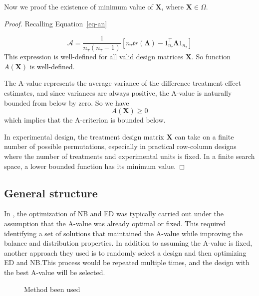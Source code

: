 \documentclass[
  a4paper,
  oneside,
  openany,
  12pt,
  onecolumn]{book}
\theoremstyle{definition}
\theoremstyle{definition}
\theoremstyle{plain}
\theoremstyle{remark}
\begin{document}
Now we proof the existence of minimum value of \(\boldsymbol{X}\), where
\(\boldsymbol{X}\in\Omega\).

\begin{proof}
Recalling Equation~\ref{eq-an}

\[
\mathcal{A}=\frac{1}{n_{\tau}(n_{\tau}-1)}[n_{\tau}tr(\boldsymbol{\Lambda})-\mathcal{1}_{n_{\tau}}^\top\boldsymbol{\Lambda}\mathcal{1}_{n_{\tau}}]
\] This expression is well-defined for all valid design matrices
\(\boldsymbol{X}\). So function \(A(\boldsymbol{X})\) is well-defined.

The A-value represents the average variance of the difference treatment
effect estimates, and since variances are always positive, the A-value
is naturally bounded from below by zero. So we have \[
A(\boldsymbol{X})\geq0
\] which implies that the A-criterion is bounded below.

In experimental design, the treatment design matrix \(\boldsymbol{X}\)
can take on a finite number of possible permutations, especially in
practical row-column designs where the number of treatments and
experimental units is fixed. In a finite search space, a lower bounded
function has its minimum value.
\end{proof}

\subsection{General structure}\label{general-structure}

In \citet{piepho2018neighbor}, the optimization of NB and ED was
typically carried out under the assumption that the A-value was already
optimal or fixed. This required identifying a set of solutions that
maintained the A-value while improving the balance and distribution
properties. In addition to assuming the A-value is fixed, another
approach they used is to randomly select a design and then optimizing ED
and NB.This process would be repeated multiple times, and the design
with the best A-value will be selected.

\begin{figure}


\caption{\label{fig-usedmethod}Method been used}

\end{figure}%
\end{document}
